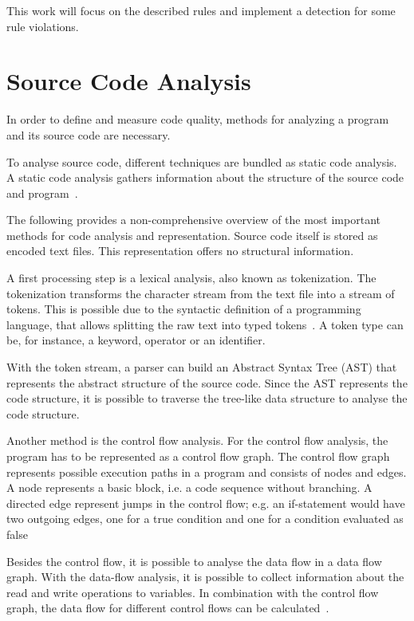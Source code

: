 This work will focus on the described rules and implement a detection for some rule violations.

\section{Source Code Analysis}\label{sec:code_analysis}
In order to define and measure code quality, methods for analyzing a program and its source code are necessary.

To analyse source code, different techniques are bundled as static code analysis. A static code analysis gathers information about the structure of the source code and program~\cite{prahofer_static_2017}.

The following provides a non-comprehensive overview of the most important methods for code analysis and representation.
Source code itself is stored as encoded text files. This representation offers no structural information. 

A first processing step is a lexical analysis, also known as tokenization. The tokenization transforms the character stream from the text file into a stream of tokens. This is possible due to the syntactic definition of a programming language, that allows splitting the raw text into typed tokens~\cite{mogensen_introduction_2017}. A token type can be, for instance, a keyword, operator or an identifier.

With the token stream, a parser can build an Abstract Syntax Tree (AST) that represents the abstract structure of the source code.
Since the AST represents the code structure, it is possible to traverse the tree-like data structure to analyse the code structure.

Another method is the control flow analysis. For the control flow analysis, the program has to be represented as a control flow graph. The control flow graph represents possible execution paths in a program and consists of nodes and edges. A node represents a basic block, i.e. a code sequence without branching. A directed edge represent jumps in the control flow; e.g. an if-statement would have two outgoing edges, one for a true condition and one for a condition evaluated as false~\cite{allen_control_1970}

Besides the control flow, it is possible to analyse the data flow in a data flow graph. With the data-flow analysis, it is possible to collect information about the read and write operations to variables. In combination with the control flow graph, the data flow for different control flows can be calculated~\cite{mogensen_introduction_2017}.

